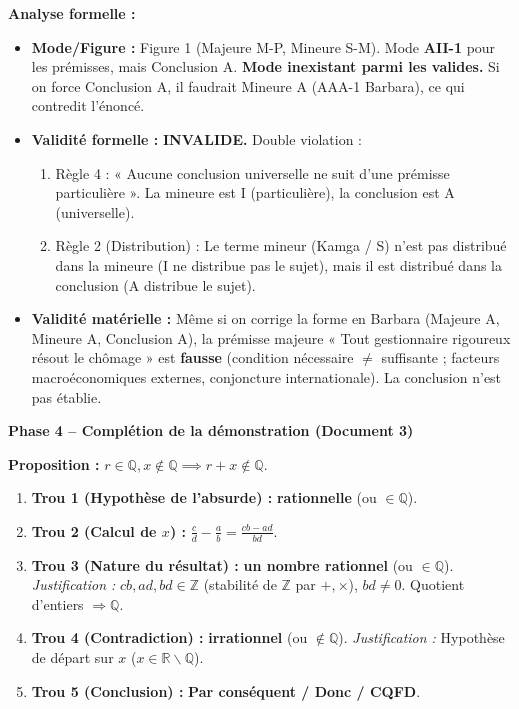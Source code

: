 \documentclass[11pt]{article}
\def\setminus{\mathbin{\backslash}}\let\smallsetminus\setminus
\begin{document}
\begin{exoresolu}
\noindent\textbf{Analyse formelle :}
\begin{itemize}
    \item \textbf{Mode/Figure :} Figure 1 (Majeure M-P, Mineure S-M). Mode \textbf{AII-1} pour les prémisses, mais Conclusion A. \textbf{Mode inexistant parmi les valides.} Si on force Conclusion A, il faudrait Mineure A (AAA-1 Barbara), ce qui contredit l'énoncé.
    \item \textbf{Validité formelle :} \textbf{INVALIDE.} Double violation :
    \begin{enumerate}
        \item Règle 4 : « Aucune conclusion universelle ne suit d'une prémisse particulière ». La mineure est I (particulière), la conclusion est A (universelle).
        \item Règle 2 (Distribution) : Le terme mineur (Kamga / S) n'est pas distribué dans la mineure (I ne distribue pas le sujet), mais il est distribué dans la conclusion (A distribue le sujet).
    \end{enumerate}
    \item \textbf{Validité matérielle :} Même si on corrige la forme en Barbara (Majeure A, Mineure A, Conclusion A), la prémisse majeure « Tout gestionnaire rigoureux résout le chômage » est \textbf{fausse} (condition nécessaire $\neq$ suffisante ; facteurs macroéconomiques externes, conjoncture internationale). La conclusion n'est pas établie.
\end{itemize}

\medskip
\noindent\textbf{Phase 4 -- Complétion de la démonstration (Document 3)}

\noindent\textbf{Proposition :} $r \in \mathbb{Q}, x \notin \mathbb{Q} \implies r+x \notin \mathbb{Q}$.

\begin{enumerate}
    \item \textbf{Trou 1 (Hypothèse de l'absurde) :} \textbf{rationnelle} (ou $\in \mathbb{Q}$).
    \item \textbf{Trou 2 (Calcul de $x$) :} $\frac{c}{d} - \frac{a}{b} = \frac{cb - ad}{bd}$.
    \item \textbf{Trou 3 (Nature du résultat) :} \textbf{un nombre rationnel} (ou $\in \mathbb{Q}$). \emph{Justification :} $cb, ad, bd \in \mathbb{Z}$ (stabilité de $\mathbb{Z}$ par $+,\times$), $bd \neq 0$. Quotient d'entiers $\Rightarrow \mathbb{Q}$.
    \item \textbf{Trou 4 (Contradiction) :} \textbf{irrationnel} (ou $\notin \mathbb{Q}$). \emph{Justification :} Hypothèse de départ sur $x$ ($x \in \mathbb{R} \setminus \mathbb{Q}$).
    \item \textbf{Trou 5 (Conclusion) :} \textbf{Par conséquent / Donc / CQFD}.
\end{enumerate}


\end{exoresolu}
\end{document}
